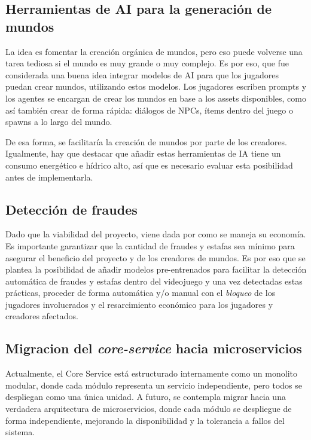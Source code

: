 \vspace{0.25cm}

\subsection{Herramientas de AI para la generación de mundos}
La idea es fomentar la creación orgánica de mundos, pero eso puede volverse una tarea tediosa si el mundo es muy grande 
o muy complejo. Es por eso, que fue considerada una buena idea integrar modelos de AI para que los jugadores 
puedan crear mundos, utilizando estos modelos. Los jugadores escriben prompts y los agentes se 
encargan de crear los mundos en base a los assets disponibles, como así también crear de forma rápida: 
diálogos de NPCs, ítems dentro del juego o spawns a lo largo del mundo.

\vspace{0.25cm}

De esa forma, se facilitaría la creación de mundos por parte de los creadores. Igualmente, hay que destacar que añadir
estas herramientas de IA tiene un consumo energético e hídrico alto, así que es necesario evaluar esta posibilidad antes
de implementarla.

\vspace{0.25cm}

\subsection{Detección de fraudes}
Dado que la viabilidad del proyecto, viene dada por como se maneja su economía. 
Es importante garantizar que la cantidad de fraudes y estafas sea mínimo para asegurar el beneficio del proyecto y de los 
creadores de mundos. Es por eso que se plantea la posibilidad de añadir modelos pre-entrenados para facilitar la 
detección automática de fraudes y estafas dentro del videojuego y una vez detectadas estas prácticas, proceder de forma automática 
y/o manual con el \textit{bloqueo} de los jugadores involucrados y el resarcimiento económico para los jugadores 
y creadores afectados.

\vspace{0.25cm}

\subsection{Migracion del \textit{core-service} hacia microservicios}
Actualmente, el Core Service está estructurado internamente como un monolito modular, donde cada módulo 
representa un servicio independiente, pero todos se despliegan como una única unidad. A futuro, se 
contempla migrar hacia una verdadera arquitectura de microservicios, donde cada módulo se despliegue 
de forma independiente, mejorando la disponibilidad y la tolerancia a fallos del sistema.

